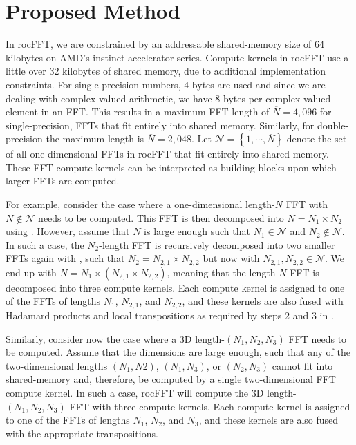 \documentclass[11pt, onecolumn, journal,compsoc]{IEEEtran}
\theoremstyle{problemstyle}
\begin{document}
\section{Proposed Method}

In rocFFT, we are constrained by an addressable shared-memory size of
$64$ kilobytes on AMD's instinct accelerator series. Compute kernels in rocFFT use
a little over $32$ kilobytes of shared memory, due to additional
implementation constraints. For single-precision numbers, $4$ bytes
are used and since we are dealing with complex-valued arithmetic, we
have $8$ bytes per complex-valued element in an FFT. This results in a
maximum FFT length of $\overline{N} = 4,096$ for single-precision, FFTs
that fit entirely into shared memory. Similarly, for double-precision
the maximum length is $\overline{N} = 2,048$. Let $\mathcal{N} = \left\{
1, \cdots, \overline{N} \right\}$ denote the set of all one-dimensional
FFTs in rocFFT that fit entirely into shared memory. These FFT compute
kernels can be interpreted as building blocks upon which larger FFTs
are computed.

For example, consider the case where a one-dimensional length-$N$ FFT with $N \notin \mathcal{N}$ needs to be computed. This FFT is then decomposed into $N = N_1 \times N_2$ using . However, assume that $N$ is large enough such that $N_1 \in \mathcal{N}$ and $N_2 \notin \mathcal{N}$. In such a case, the $N_2$-length FFT is recursively decomposed into two smaller FFTs again with , such that $N_2 = N_{2,1} \times N_{2,2}$ but now with $N_{2,1}, N_{2,2} \in \mathcal{N}$. We end up with $N = N_1 \times (N_{2,1} \times N_{2,2})$, meaning that the length-$N$ FFT is decomposed into three compute kernels. Each compute kernel is assigned to one of the FFTs of lengths $N_1$, $N_{2,1}$, and $N_{2,2}$, and these kernels are also fused with Hadamard products and local transpositions as required by steps 2 and 3 in . 

Similarly, consider now the case where a 3D length-$(N_1,N_2,N_3)$ FFT needs to be computed. Assume that the dimensions are large enough, such that any of the two-dimensional lengths $(N_1,N2)$, $(N_1,N_3)$, or $(N_2,N_3)$ cannot fit into shared-memory and, therefore, be computed by a single two-dimensional FFT compute kernel. In such a case, rocFFT will compute the 3D length-$(N_1,N_2,N_3)$ FFT with three compute kernels. Each compute kernel is assigned to one of the FFTs of lengths $N_1$, $N_2$, and $N_3$, and these kernels are also fused with the appropriate transpositions.
\end{document}

